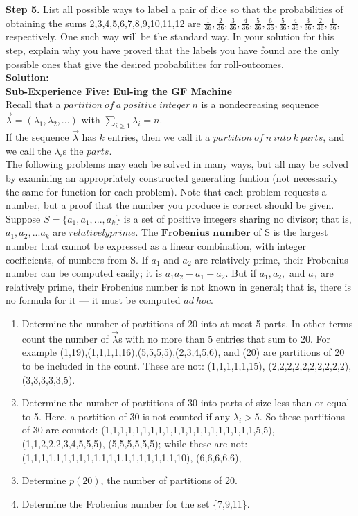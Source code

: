 \documentclass[10pt,a4paper]{report}
\begin{document}
	\newline
	\textbf{Step 5.} List all possible ways to label a pair of dice so that the probabilities of obtaining the sums 2,3,4,5,6,7,8,9,10,11,12 are $\frac{1}{36},\frac{2}{36},\frac{3}{36},\frac{4}{36},\frac{5}{36},\frac{6}{36},\frac{5}{36},\frac{4}{36},\frac{3}{36},\frac{2}{36},\frac{1}{36}$, respectively.  One such way will be the standard way.  In your solution for this step, explain why you have proved that the labels you have found are the only possible ones that give the desired probabilities for roll-outcomes.\\
	\newline
	\textbf{Solution: }\\
	\newline
	\textbf{Sub-Experience Five: Eul-ing the GF Machine}\\
	Recall that a $partition\ of\ a\ positive\ integer\ n$ is a nondecreasing sequence $\vec{\lambda} = (\lambda_1,\lambda_2,...)$ with $\sum_{i\geq1}^{}\lambda_i = n$.\\
	If the sequence $\vec{\lambda}$ has $k$ entries, then we call it a $partition\ of\ n\ into\ k\ parts$, and we call the $\lambda_i$s the $parts$.\\
	The following problems may each be solved in many ways, but all may be solved by examining an appropriately constructed generating funtion (not necessarily the same for function for each problem).  Note that each problem requests a number, but a proof that the number you produce is correct should be given.\\
	Suppose $S = \{a_1,a_1,...,a_k\}$ is a set of positive integers sharing no divisor; that is, $a_1,a_2,...a_k$ are $relatively prime$.  The $\textbf{Frobenius number}$ of S is the largest number that cannot be expressed as a linear combination, with integer coefficients, of numbers from S.  If $a_1$ and $a_2$ are relatively prime, their Frobenius number can be computed easily; it is $a_1a_2 - a_1 - a_2$.  But if $a_1,a_2,$ and $a_3$ are relatively prime, their Frobenius number is not known in general; that is, there is no formula for it --- it must be computed $ad\ hoc$.\\
	\begin{enumerate}
		\item Determine the number of partitions of 20 into at most 5 parts.  In other terms count the number of $\vec{\lambda}$s with no more than 5 entries that sum to 20.  For example (1,19),(1,1,1,1,16),(5,5,5,5),(2,3,4,5,6), and (20) are partitions of 20 to be included in the count.  These are not: (1,1,1,1,1,15), (2,2,2,2,2,2,2,2,2,2), (3,3,3,3,3,5).
		\item Determine the number of partitions of 30 into parts of size less than or equal to 5.  Here, a partition of 30 is not counted if any $\lambda_i > 5$.  So these partitions of 30 are counted: (1,1,1,1,1,1,1,1,1,1,1,1,1,1,1,1,1,1,1,1,5,5), (1,1,2,2,2,3,4,5,5,5), (5,5,5,5,5,5); while these are not: (1,1,1,1,1,1,1,1,1,1,1,1,1,1,1,1,1,1,1,1,10), (6,6,6,6,6),
		\item Determine $p(20)$, the number of partitions of 20.
		\item Determine the Frobenius number for the set \{7,9,11\}.
	\end{enumerate}
\end{document}
